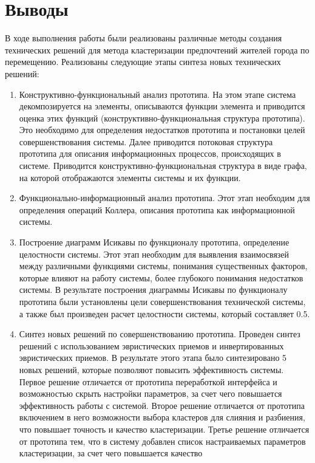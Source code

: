 \chapter{Выводы}
В ходе выполнения работы были реализованы различные методы создания технических
решений для метода кластеризации предпочтений жителей города по перемещению.
Реализованы следующие этапы синтеза новых технических решений:
\begin{enumerate}
  \item Конструктивно-функциональный анализ прототипа. На этом этапе система
    декомпозируется на элементы, описываются функции элемента и приводится
    оценка этих функций (конструктивно-функциональная структура прототипа). Это
    необходимо для определения недостатков прототипа и постановки целей
    совершенствования системы. Далее приводится потоковая структура
    прототипа для описания информационных процессов, происходящих в системе.
    Приводится конструктивно-функциональная структура в виде графа, на которой
    отображаются элементы системы и их функции.
  \item Функционально-информационный анализ прототипа. Этот этап необходим для
    определения операций Коллера, описания прототипа как информационной
    системы. 
  \item Построение диаграмм Исикавы по функционалу прототипа, определение
    целостности системы. Этот этап необходим для выявления взаимосвязей между
    различными функциями системы, понимания существенных факторов, которые
    влияют на работу системы, более глубокого понимания недостатков системы.
    В результате построения диаграммы Исикавы по функционалу прототипа были
    установлены цели совершенствования технической системы, а также был
    произведен расчет целостности системы, который составляет 0.5.
  \item Синтез новых решений по совершенствованию прототипа. Проведен синтез
    решений с использованием эвристических приемов и инвертированных
    эвристических приемов. В результате этого этапа было синтезировано 5 новых
    решений, которые позволяют повысить эффективность системы.
    Первое решение отличается от прототипа переработкой интерфейса и
    возможностью скрыть настройки параметров, за счет чего повышается
    эффективность работы с системой.
    Второе решение отличается от прототипа включением в него возможности
    выбора кластеров для слияния и разбиения, что повышает точность и качество
    кластеризации.
    Третье решение отличается от прототипа тем, что в систему добавлен список
    настраиваемых параметров кластеризации, за счет чего повышается качество

\end{enumerate}
